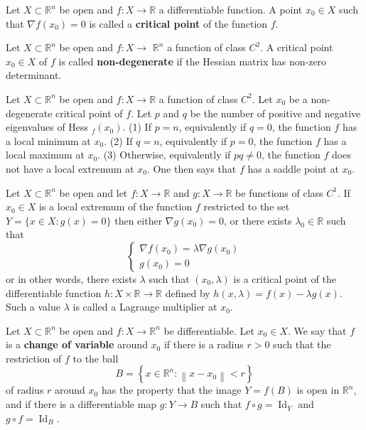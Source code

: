 \documentclass[10pt,landscape, a4paper]{article}
\newcommand{\custombox}[3]{\begin{tcolorbox}[left=0mm,right=0mm,bottom=0mm,top=0mm,title = \textbf{#1}, colback=#2!10!white, colframe = #2!70!white, coltitle=white, breakable]
    #3
    \end{tcolorbox}}
\newcommand{\definition}[2]{\custombox{Definition #1}{red}{#2}}
\newcommand{\prop}[2]{\custombox{Proposition #1}{black!50!orange!30!yellow}{#2}}
\newcommand{\corollary}[2]{\custombox{Corollary #1}{orange}{#2}}
\newcommand{\R}{\mathbb{R}}
\newcommand{\Rn}{\R^n}
\begin{document}
\begin{multicols*}{3}
    \definition{3.8.2 (Critical point)}{Let $X \subset \Rn$ be open and $f: X \rightarrow \R$ a differentiable function. A point $x_{0} \in X$ such that $\nabla f\left(x_{0}\right)=0$ is called a \textbf{critical point} of the function $f$.}

    \definition{3.8.6 (Non-degenerate critical point)}{Let $X \subset \Rn$ be open and $f: X \rightarrow$ $\Rn$ a function of class $C^{2}$. A critical point $x_{0} \in X$ of $f$ is called \textbf{non-degenerate} if the Hessian matrix has non-zero determinant.}


    \corollary{3.8}{
        Let $X \subset \Rn$ be open and $f: X \rightarrow \R$ a function of class $C^{2}$. Let $x_{0}$ be a non-degenerate critical point of $f .$ Let $p$ and $q$ be the number of positive and negative eigenvalues of Hess $_{f}\left(x_{0}\right)$. (1) If $p=n$, equivalently if $q=0$, the function $f$ has a local minimum at $x_{0}$. (2) If $q=n$, equivalently if $p=0$, the function $f$ has a local maximum at $x_{0}$. (3) Otherwise, equivalently if $p q \neq 0$, the function $f$ does not have a local extremum at $x_{0}$. One then says that $f$ has a saddle point at $x_{0}$.
    }

    \prop{3.9.2}{
        Let $X \subset \Rn$ be open and let $f: X \rightarrow \R$ and $g: X \rightarrow \R$ be functions of class $C^{1}$. If $x_{0} \in X$ is a local extremum of the function $f$ restricted to the set
        $
            Y=\{x \in X: g(x)=0\}
        $
        then either $\nabla g\left(x_{0}\right)=0$, or there exists $\lambda_{0} \in \R$ such that
        $$
            \left\{\begin{array}{l}
                \nabla f\left(x_{0}\right)=\lambda \nabla g\left(x_{0}\right) \\
                g\left(x_{0}\right)=0
            \end{array}\right.
        $$
        or in other words, there exists $\lambda$ such that $\left(x_{0}, \lambda\right)$ is a critical point of the differentiable function $h: X \times \R \rightarrow \R$ defined by
        $
            h(x, \lambda)=f(x)-\lambda g(x) .
        $
        Such a value $\lambda$ is called a Lagrange multiplier at $x_{0}$.
    }

    \definition{3.10.1 (Change of variable)}{
    Let $X \subset \Rn$ be open and $f: X \rightarrow \Rn$ be differentiable. Let $x_{0} \in X$. We say that $f$ is a \textbf{change of variable} around $x_{0}$ if there is a radius $r>0$ such that the restriction of $f$ to the ball
    $$
        B=\left\{x \in \Rn:\left\|x-x_{0}\right\|<r\right\}
    $$
    of radius $r$ around $x_{0}$ has the property that the image $Y=f(B)$ is open in $\Rn$, and if there is a differentiable map $g: Y \rightarrow B$ such that $f \circ g=\operatorname{Id}_{Y}$ and $g \circ f=\operatorname{Id}_{B}$.
    }


\end{multicols*}
\end{document}
